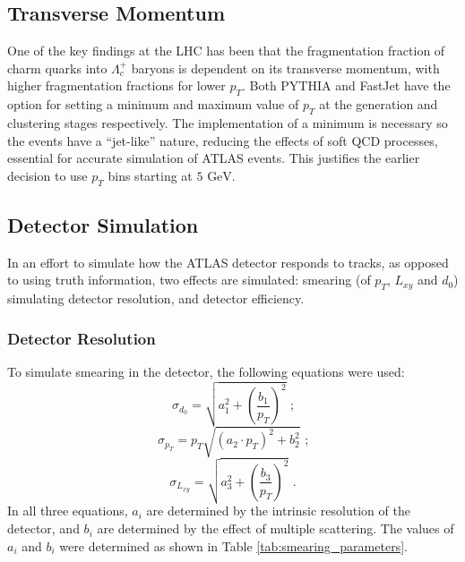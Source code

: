 \documentclass[12pt]{article}
\begin{document}
\subsection{Transverse Momentum}
One of the key findings at the LHC has been that the fragmentation fraction of charm quarks into $\Lambda_c^+$ baryons is dependent on its transverse momentum, with higher fragmentation fractions for lower $p_T$. Both PYTHIA and FastJet have the option for setting a minimum and maximum value of $p_T$ at the generation and clustering stages respectively. The implementation of a minimum is necessary so the events have a ``jet-like'' nature, reducing the effects of soft QCD processes, essential for accurate simulation of ATLAS events. This justifies the earlier decision to use $p_T$ bins starting at $5 \text{ GeV}$.

\subsection{Detector Simulation}

In an effort to simulate how the ATLAS detector responds to tracks, as opposed to using truth information, two effects are simulated: smearing (of $p_T$, $L_{xy}$ and $d_0$) simulating detector resolution, and detector efficiency.

\subsubsection{Detector Resolution}
To simulate smearing in the detector, the following equations were used:
\begin{equation}
    \sigma_{d_0} = \sqrt{a_1^2 + \left(\frac{b_1}{p_T}\right)^2} \text{ ;}
\end{equation}
\begin{equation}
    \sigma_{p_T} = p_T \sqrt{(a_2 \cdot p_T)^2 + b_2^2} \text{ ;}
\end{equation}
\begin{equation}
    \sigma_{L_{xy}} = \sqrt{a_3^2 + \left(\frac{b_3}{p_T}\right)^2} \text{ .}
\end{equation}
In all three equations, $a_i$ are determined by the intrinsic resolution of the detector, and $b_i$ are determined by the effect of multiple scattering. The values of $a_i$ and $b_i$ were determined as shown in Table \ref{tab:smearing_parameters}.
\end{document}
